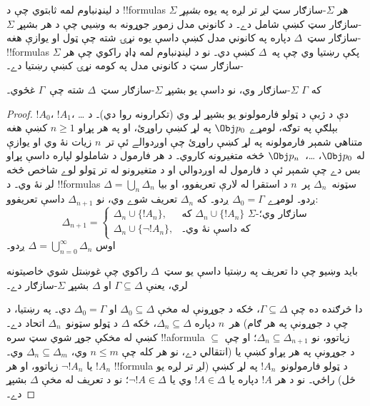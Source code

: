 \documentclass[../../../include/open-logic-section]{subfiles}
\begin{document}


د لينډنباوم لمه ثابتوي چې د !!{formula}s هر $\Sigma$-سازګار سټ
لږ تر لږه په يوه \emph{بشپړ} $\Sigma$-سازګار سټ کښې شامل دے۔
د کانوني مدل زموږ جوړونه به وښيي چې د هر بشپړ $\Sigma$-سازګار
سټ~$\Delta$ دپاره په کانوني مدل کښې داسې يوه نړۍ شته چې ټول او
يوازې هغه !!{formula}s پکې رښتيا وي چې په~$\Delta$ کښې دي۔ نو د
لينډنباوم لمه ډاډ راکوي چې هر $\Sigma$-سازګار سټ د کانوني مدل
په کومه نړۍ کښې رښتيا دے۔

\begin{thm}
  که $\Gamma$ $\Sigma$-سازګار وي، نو داسې يو بشپړ $\Sigma$-سازګار
  سټ~$\Delta$ شته چې~$\Gamma$ غځوي۔
\end{thm}

\begin{proof}
$!A_0$، $!A_1$، \dots{} دې د ژبې د ټولو فارمولونو يو بشپړ لړ
وي (تکرارونه روا دي)۔ د بېلګې په توګه، لومړے $\Obj p_0$ په لړ
کښې راوړئ، او په هر پړاو $n \ge 1$ کښې هغه متناهي شمېر فارمولونه
په لړ کښې راوړئ چې اوږدوالے ئې تر~$n$ زيات نۀ وي او يوازې له
$\Obj p_0$، \dots،~$\Obj p_n$ څخه متغيرونه کاروي۔ د هر
فارمول د شاملولو لپاره داسې پړاو بس دے چې شمېر ئې د فارمول له
اوږدوالي او د متغيرونو له تر ټولو لوے شاخص څخه لږ نۀ وي۔
د !!{formula}s سټونه~$\Delta_n$ پر~$n$ د استقرا له لارې تعريفوو،
او بيا $\Delta = \bigcup_n \Delta_n$ ږدو۔ لومړے $\Delta_0 = \Gamma$
ږدو۔ که $\Delta_n$ تعريف شوے وي، نو $\Delta_{n+1}$ داسې تعريفوو:
\[
\Delta_{n+1} =
\begin{cases}
  \Delta_n \cup \{!A_n\}, & \text{که $\Delta_n \cup \{ !A_n\}$
    $\Sigma$-سازګار وي؛} \\
  \Delta_n \cup \{ \lnot !A_n\}, & \text{که داسې نۀ وي۔}
\end{cases}
\]
اوس $\Delta = \bigcup_{n=0}^\infty \Delta_n$ ږدو۔

بايد وښيو چې دا تعريف په رښتيا داسې يو سټ~$\Delta$ راکوي چې
غوښتل شوي خاصيتونه لري، يعنې $\Gamma \subseteq \Delta$ او
$\Delta$ بشپړ $\Sigma$-سازګار دے۔

دا څرګنده ده چې $\Gamma \subseteq \Delta$، ځکه د جوړونې له مخې
$\Delta_0 \subseteq \Delta$ او $\Delta_0 = \Gamma$ دي۔ په رښتيا،
د هر~$n$ دپاره $\Delta_n \subseteq \Delta$، ځکه $\Delta$ د ټولو
سټونو~$\Delta_n$ اتحاد دے۔ (چې د جوړونې په هر ګام کښې له مخکې
جوړ شوي سټ سره !!a{formula} زياتوو، نو $\Delta_n \subseteq
\Delta_{n+1}$؛ او چې $\subseteq$ انتقالي دے، نو هر کله چې
$n \le m$ وي، $\Delta_n \subseteq \Delta_{m}$ وي۔) د جوړونې په
هر پړاو کښې يا $!A_n$ يا $\lnot !A_n$ زياتوو، او هر !!{formula}
د ټولو فارمولونو~$!A_n$ په لړ کښې (لږ تر لږه يو ځل) راځي۔ نو د
هر $!A$ دپاره يا $!A \in \Delta$ وي يا $\lnot !A \in \Delta$؛
نو د تعريف له مخې $\Delta$ بشپړ دے۔


\end{proof}
\end{document}
